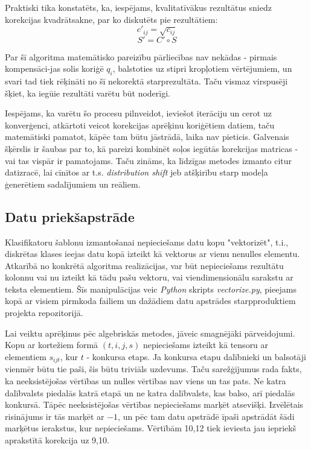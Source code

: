 \documentclass[12pt, a4paper]{article}
\numberwithin{equation}{section} %
\begin{document}
Praktiski tika konstatēts, ka, iespējams, kvalitatīvākus rezultātus sniedz korekcijas kvadrātsakne, par ko diskutēts pie rezultātiem:
\begin{equation}
    c'_{ij} = \sqrt{c_{ij}}
\end{equation}
\begin{equation}
    S' = C' \circ S
\end{equation}


Par šī algoritma matemātisko pareizību pārliecības nav nekādas - pirmais kompensāci-jas solis koriģē $q_i$, balstoties uz stipri kropļotiem vērtējumiem, un svari tad tiek rēķināti no šī nekorektā starprezultāta. Taču vismaz virspusēji šķiet, ka iegūie rezultāti varētu būt noderīgi. 

Iespējams, ka varētu šo procesu pilnveidot, ieviešot iterāciju un cerot uz konverģenci, atkārtoti veicot korekcijas aprēķinu koriģētiem datiem, taču matemātiski pamatot, kāpēc tam būtu jāstrādā, laika nav pieticis. Galvenais šķērslis ir šaubas par to, kā pareizi kombinēt soļos iegūtās korekcijas matricas - vai tas vispār ir pamatojams. Taču zināms, ka līdzīgas metodes izmanto citur datizracē, lai cīnītos ar t.s. \textit{distribution shift} jeb atšķirību starp modeļa ģenerētiem sadalījumiem un reāliem.

\subsection{Datu priekšapstrāde}

Klasifikatoru šablonu izmantošanai nepieciešams datu kopu "vektorizēt", t.i., diskrētas klases ieejas datu kopā izteikt kā vektorus ar vienu nenulles elementu. Atkarībā no konkrētā algoritma realizācijas, var būt nepieciešams rezultātu kolonnu vai nu izteikt kā tādu pašu vektoru, vai viendimensionālu sarakstu ar teksta elementiem. Šīs manipulācijas veic \textit{Python} skripts \textit{vectorize.py}, pieejams kopā ar visiem pirmkoda failiem un dažādiem datu apstrādes starpproduktiem projekta repozitorijā.

Lai veiktu aprēķinus pēc algebriskās metodes, jāveic smagnējāki pārveidojumi. Kopu ar kortežiem formā $(t,i,j,s)$ nepieciešams izteikt kā tensoru ar elementiem $s_{ijt}$, kur $t$ - konkursa etaps. Ja konkursa etapu dalībnieki un balsotāji vienmēr būtu tie paši, šis būtu triviāls uzdevums. Taču sarežģījumus rada fakts, ka neeksistējošas vērtības un nulles vērtības nav viens un tas pats. Ne katra dalībvalsts piedalās katrā etapā un ne katra dalībvalsts, kas balso, arī piedalās konkursā. Tāpēc neeksistējošas vērtības nepieciešams marķēt atsevišķi. Izvēlētais risinājums ir tās marķēt ar $-1$, un pēc tam datu apstrādē īpaši apstrādāt šādi marķētus ierakstus, kur nepieciešams. Vērtībām 10,12 tiek ieviesta jau iepriekš aprakstītā korekcija uz 9,10.
\end{document}
